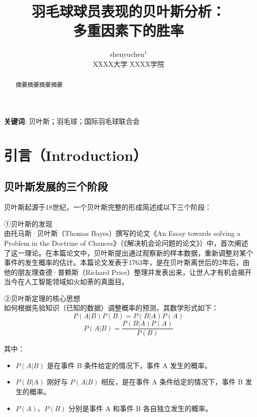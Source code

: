 \documentclass[12pt]{article}
\begin{document}
\title{羽毛球球员表现的贝叶斯分析：\\ 多重因素下的胜率}		%
\date{}

\author{shenyuchen$^1$		\\		XXXX大学 XXXX学院}		%
\maketitle

\begin{abstract}
	摘要摘要摘要摘要

\end{abstract}

\textbf{关键词}: 贝叶斯；羽毛球；国际羽毛球联合会


\section{引言（Introduction）}
\subsection{贝叶斯发展的三个阶段}
贝叶斯起源于18世纪，一个贝叶斯完整的形成简述成以下三个阶段：

①贝叶斯的发现 \\
由托马斯·贝叶斯（Thomas Bayes）撰写的论文《An Essay towards solving a Problem in the Doctrine of Chances》（《解决机会论问题的论文》）中，首次阐述了这一理论。在本篇论文中，贝叶斯提出通过观察新的样本数据，重新调整对某个事件的发生概率的估计。本篇论文发表于1763年，是在贝叶斯离世后的2年后，由他的朋友理查德·普赖斯（Richard Price）整理并发表出来，让世人才有机会揭开当今在人工智能领域如火如荼的真面目。

②贝叶斯定理的核心思想 \\
如何根据先验知识（已知的数据）调整概率的预测，其数学形式如下：
\begin{equation}
	P(A|B){P(B)}={P(B|A)P(A)}
	\end{equation}
\begin{equation}
    P(A|B)=\frac{P(B|A)P(A)}{P(B)}
\end{equation}

其中：
\begin{itemize}
	\item $P(A|B)$ 是在事件 B 条件给定的情况下，事件 A 发生的概率。
	\item $P(B|A)$ 刚好与 $P(A|B)$ 相反，是在事件 A 条件给定的情况下，事件 B 发生的概率。
	\item $P(A)$、$P(B)$ 分别是事件 A 和事件 B 各自独立发生的概率。
	\end{itemize}
\end{document}
